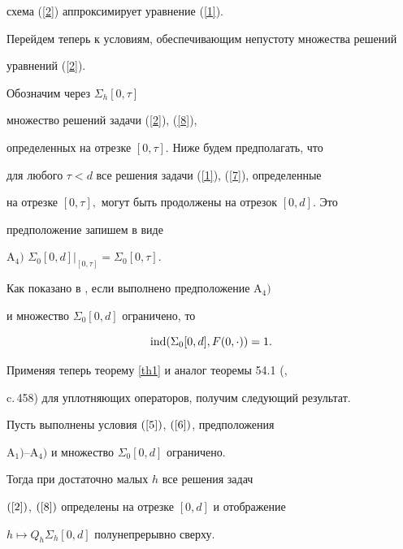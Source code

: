 схема (\ref{2}) аппроксимирует уравнение (\ref{1}).





Перейдем теперь к условиям, обеспечивающим непустоту множества решений


уравнений (\ref{2}).


Обозначим через $\Sigma_h [0,\tau ]$ 


множество решений задачи (\ref{2}), (\ref{8}),


определенных на отрезке $[0,\tau ]$. Ниже будем предполагать, что 


для любого $\tau < d$ все решения задачи (\ref{1}), (\ref{7}), определенные


на отрезке $[0,\tau ],$ могут быть продолжены на отрезок $[0,d]$. Это 


предположение запишем в виде





$\mathrm A_4)$\; $\Sigma_0 [0,d] \big|_{[0,\tau ]} = \Sigma_0 [0, \tau].$ 





Как показано в \cite{6}, если выполнено предположение $\mathrm A_4)$


и множество $\Sigma_0 [0,d]$ ограничено, то 


$$


\ind (\Sigma_0 [0,d], F(0,\cdot)) = 1.


$$ 





Применяя теперь теорему \ref{th1} и аналог теоремы 54.1 (\cite{2}, 


c.\,458) для уплотняющих операторов, получим следующий результат.





\begin{thm}\label{th2} 


Пусть выполнены условия $(\ref{5})$, $(\ref{6})$, предположения


$\mathrm A_1)$--$\mathrm A_4)$ и множество $\Sigma_0 [0,d]$ ограничено. 


Тогда при достаточно малых $h$ все решения задач 


$(\ref{2})$, $(\ref{8})$ определены на отрезке $[0,d]$ и отображение


$h\mapsto Q_h \Sigma_h [0,d]$ полунепрерывно сверху. 


\end{thm} 






